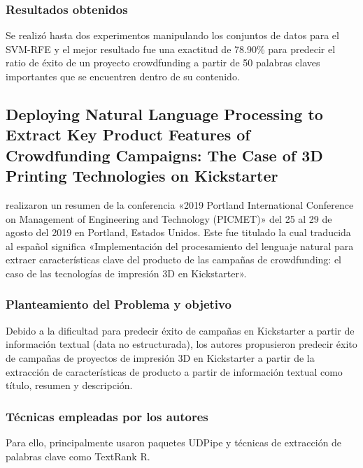 \subsubsection{Resultados obtenidos}
Se realizó hasta dos experimentos manipulando los conjuntos de datos para el SVM-RFE y el mejor resultado fue una exactitud de 78.90\% para predecir el ratio de éxito de un proyecto crowdfunding a partir de 50 palabras claves importantes que se encuentren dentro de su contenido.

\subsection{Deploying Natural Language Processing to Extract Key Product Features of Crowdfunding Campaigns: The Case of 3D Printing Technologies on Kickstarter \citep*{pr_chaichi2019nlp_3dprinting}}
\citeauthor{pr_chaichi2019nlp_3dprinting} realizaron un resumen de la conferencia «2019 Portland International Conference on Management of Engineering and Technology (PICMET)» del 25 al 29 de agosto del 2019 en Portland, Estados Unidos. Este fue titulado  la cual traducida al español significa «Implementación del procesamiento del lenguaje natural para extraer características clave del producto de las campañas de crowdfunding: el caso de las tecnologías de impresión 3D en Kickstarter».

\subsubsection{Planteamiento del Problema y objetivo}
Debido a la dificultad para predecir éxito de campañas en Kickstarter a partir de información textual (data no estructurada), los autores propusieron predecir éxito de campañas de proyectos de impresión 3D en Kickstarter a partir de la extracción de características de producto a partir de información textual como título, resumen y descripción.

\subsubsection{Técnicas empleadas por los autores}
Para ello, principalmente usaron paquetes UDPipe y técnicas de extracción de palabras clave como TextRank R.

